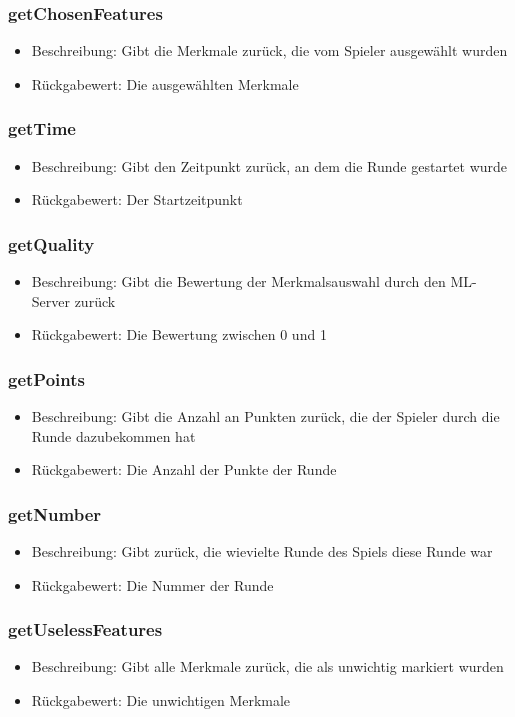 \documentclass[a4paper]{scrreprt}
\begin{document}
	\subsubsection{getChosenFeatures}
	\begin{itemize}
		\item Beschreibung: Gibt die Merkmale zurück, die vom Spieler ausgewählt wurden
		\item Rückgabewert: Die ausgewählten Merkmale
	\end{itemize}
	\subsubsection{getTime}
	\begin{itemize}
		\item Beschreibung: Gibt den Zeitpunkt zurück, an dem die Runde gestartet wurde
		\item Rückgabewert: Der Startzeitpunkt 
	\end{itemize}
	\subsubsection{getQuality}
	\begin{itemize}
		\item Beschreibung: Gibt die Bewertung der Merkmalsauswahl durch den ML-Server zurück
		\item Rückgabewert: Die Bewertung zwischen 0 und 1
	\end{itemize}
	\subsubsection{getPoints}
	\begin{itemize}
		\item Beschreibung: Gibt die Anzahl an Punkten zurück, die der Spieler durch die Runde dazubekommen hat
		\item Rückgabewert: Die Anzahl der Punkte der Runde
	\end{itemize}
	\subsubsection{getNumber}
	\begin{itemize}
		\item Beschreibung: Gibt zurück, die wievielte Runde des Spiels diese Runde war
		\item Rückgabewert: Die Nummer der Runde
	\end{itemize}
	\subsubsection{getUselessFeatures}
	\begin{itemize}
		\item Beschreibung: Gibt alle Merkmale zurück, die als unwichtig markiert wurden
		\item Rückgabewert: Die unwichtigen Merkmale
	\end{itemize}
\end{document}

